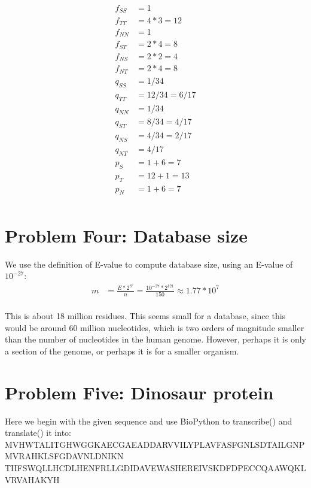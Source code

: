 \documentclass[10pt]{article} %
\begin{document}
\begin{align*}
  f_{SS} &= 1\\
  f_{TT} &= 4 * 3 = 12\\
  f_{NN} &= 1\\
  f_{ST} &= 2 * 4 = 8\\
  f_{NS} &= 2 * 2 = 4\\
  f_{NT} &= 2 * 4 = 8\\
  q_{SS} &= 1 / 34\\
  q_{TT} &= 12 / 34 = 6 / 17\\
  q_{NN} &= 1 / 34\\
  q_{ST} &= 8 / 34 = 4 / 17\\
  q_{NS} &= 4 / 34 = 2 / 17\\
  q_{NT} &= 4 / 17\\
  p_S &= 1 + 6 = 7\\
  p_T &= 12 + 1 = 13\\
  p_N &= 1 + 6 = 7\\
\end{align*}

\section{Problem Four: Database size}
We use the definition of E-value to compute database size, using an E-value of $10^{-27}$:\\

\begin{align*}
  m &= \frac{E*2^{S'}}{n} = \frac{10^{-27}*2^{121}}{150} \approx 1.77*10^7\\
\end{align*}

This is about 18 million residues. This seems small for a database, since this would be around
60 million nucleotides, which is two orders of magnitude smaller than the number of nucleotides
in the human genome. However, perhaps it is only a section of the genome, or perhaps it is for
a smaller organism.\\

\section{Problem Five: Dinosaur protein}
Here we begin with the given sequence and use BioPython to transcribe() and translate() it into:\\

MVHWTALITGHWGGKAECGAEADDARVVILYPLAVFASFGNLSDTAILGNPMVRAHKLSFGDAVNLDNIKN
TIIFSWQLLHCDLHENFRLLGDIDAVEWASHEREIVSKDFDPECCQAAWQKLVRVAHAKYH\\
\end{document}
